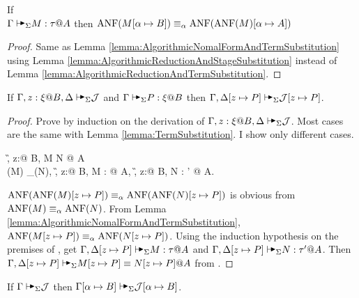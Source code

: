 \begin{lemma}
    \label{lemma:AlgorithmicNomalFormAndStageSubstitution}
    If \\ \( \G \AVS M : \tau @ A \) then
    \( \text{ANF}(M[\alpha \mapsto B]) \equiv_\alpha \text{ANF}(\text{ANF}(M)[\alpha \mapsto A]) \)
\end{lemma}

\begin{proof}
    Same as Lemma \ref{lemma:AlgorithmicNomalFormAndTermSubstitution} using
    Lemma \ref{lemma:AlgorithmicReductionAndStageSubstitution} instead of Lemma
    \ref{lemma:AlgorithmicReductionAndTermSubstitution}.
\end{proof}

\begin{lemma}
    \label{lemma:TermSubstitutionLemmaOfAlgorithmicJudgement}
    If $\G, z:\xi@B, \D \AVS \mathcal{J}$ and $\G\AVS P:\xi @B$ then $\G, \D[z \mapsto P] \AVS \mathcal{J}[z \mapsto P]$.
\end{lemma}

\begin{proof}
    Prove by induction on the derivation of \( \G, z:\xi@B, \D \AVS \mathcal{J}
    \). Most cases are the same with Lemma \ref{lemma:TermSubstitution}. I show
    only different cases.

    \begin{rneqncase}{\QAANF}{
            \G, z:\xi @ B, \D \AVS M \E N @ A
             \\
            \ANF(M) \E_\alpha \ANF(N),
            \G, z:\xi @ B, \D \AVS M : \tau @ A, 
            \G, z:\xi @ B, \D \AVS N : \tau' @ A.
        }
    \end{rneqncase}
    \( \text{ANF}(\text{ANF}(M)[z \mapsto P]) \equiv_\alpha \text{ANF}(\text{ANF}(N)[z \mapsto P]) \) is
    obvious from \( \text{ANF}(M) \equiv_\alpha \text{ANF}(N) \).  From Lemma
    \ref{lemma:AlgorithmicNomalFormAndTermSubstitution}, \( \text{ANF}(M[z \mapsto
    P]) \equiv_\alpha \text{ANF}(N[z \mapsto P]) \). Using the induction hypothesis on
    the premises of \QAANF, get \( \G, \D[z \mapsto P] \AVS M : \tau @ A \) and
    \( \G, \D[z \mapsto P] \AVS N : \tau' @ A \). Then \( \G, \D[z \mapsto P]
    \AVS M[z \mapsto P] \E N[z \mapsto P] @ A \) from \QAANF.
\end{proof}

\begin{lemma}
    \label{lemma:StageSubstitutionLemmaofAlgorithmicJudgement}
    If $\G \AVS \mathcal{J}$ then $\G[\alpha \mapsto B] \AVS \mathcal{J}[\alpha \mapsto B]$.
\end{lemma}

